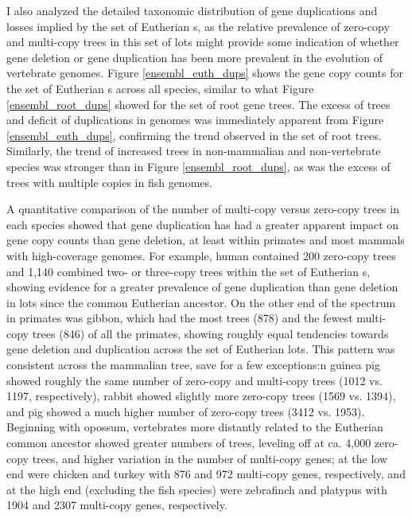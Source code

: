I also analyzed the detailed taxonomic distribution of gene
duplications and losses implied by the set of Eutherian \subtr{}s, as
the relative prevalence of zero-copy and multi-copy trees in this set
of \acp{lot} might provide some indication of whether gene deletion or
gene duplication has been more prevalent in the evolution of
vertebrate genomes. Figure \ref{ensembl_euth_dups} shows the gene copy
counts for the set of Eutherian \subtr{}s across all \ens species,
similar to what Figure \ref{ensembl_root_dups} showed for the set of
root \cmp gene trees. The excess of \zcop trees and deficit of
duplications in \lcv genomes was immediately apparent from Figure
\ref{ensembl_euth_dups}, confirming the trend observed in the set of
root \cmp trees. Similarly, the trend of increased \zcop trees in
non-mammalian and non-vertebrate species was stronger than in Figure
\ref{ensembl_root_dups}, as was the excess of trees with multiple
copies in fish genomes.

A quantitative comparison of the number of multi-copy versus zero-copy
trees in each species showed that gene duplication has had a greater
apparent impact on gene copy counts than gene deletion, at least
within primates and most mammals with high-coverage genomes. For
example, human contained 200 zero-copy trees and 1,140 combined two-
or three-copy trees within the set of Eutherian \subtr{}s, showing
evidence for a greater prevalence of gene duplication than gene
deletion in \acp{lot} since the common Eutherian ancestor. On the
other end of the spectrum in primates was gibbon, which had the most
\zcop trees (878) and the fewest multi-copy trees (846) of all the
primates, showing roughly equal tendencies towards gene deletion and
duplication across the set of Eutherian \acp{lot}. This pattern was
consistent across the mammalian tree, save for a few exceptions:n
guinea pig showed roughly the same number of zero-copy and multi-copy
trees (1012 vs. 1197, respectively), rabbit showed slightly more
zero-copy trees (1569 vs. 1394), and pig showed a much higher number
of zero-copy trees (3412 vs. 1953). Beginning with opossum,
vertebrates more distantly related to the Eutherian common ancestor
showed greater numbers of \zcop trees, leveling off at ca. 4,000
zero-copy trees, and higher variation in the number of multi-copy
genes; at the low end were chicken and turkey with 876 and 972
multi-copy genes, respectively, and at the high end (excluding the
fish species) were zebrafinch and platypus with 1904 and 2307
multi-copy genes, respectively.


